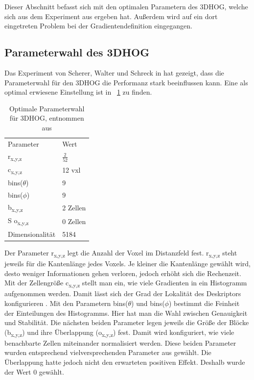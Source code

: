 Dieser Abschnitt befasst sich mit den optimalen Parametern des 3DHOG, welche sich aus dem Experiment aus \cite{scherer2010histograms} ergeben hat. Außerdem wird auf ein dort eingetreten Problem bei der Gradientendefinition eingegangen.
\subsection{Parameterwahl des 3DHOG}
Das Experiment von Scherer, Walter und Schreck in \cite{scherer2010histograms} hat gezeigt, dass die Parameterwahl für den 3DHOG die Performanz stark beeinflussen kann. Eine als optimal erwiesene Einstellung ist in \figurename~\ref{Parameter} zu finden.

\begin{table}[H]
	\centering
	\caption{Optimale Parameterwahl für 3DHOG, entnommen aus \cite{scherer2010histograms}}
	\label{Parameter}
	\begin{tabular}{ll}
		Parameter                & Wert     \\
		r\textsubscript{x,y,z} & $\frac{2}{52}$    \\
		c\textsubscript{x,y,z} & 12 vxl   \\
		bins($ \theta $)       & 9        \\
		bins($ \phi $)         & 9        \\
		b\textsubscript{x,y,z} & 2 Zellen \\S
		o\textsubscript{x,y,z} & 0 Zellen \\
		Dimensionalität          & 5184    
	\end{tabular}
	
\end{table}

Der Parameter r\textsubscript{x,y,z} legt die Anzahl der Voxel im Distanzfeld fest. r\textsubscript{x,y,z} steht jeweils für die Kantenlänge jedes Voxels. Je kleiner die Kantenlänge gewählt wird, desto weniger Informationen gehen verloren, jedoch erhöht sich die Rechenzeit. Mit der Zellengröße c\textsubscript{x,y,z} stellt man ein, wie viele Gradienten in ein Histogramm aufgenommen werden. Damit lässt sich der Grad der Lokalität des Deskriptors konfigurieren \cite{scherer2010histograms}.
Mit den Parametern 	bins($ \theta $) und bins($ \phi $) bestimmt die Feinheit der Einteilungen des Histogramms. Hier hat man die Wahl zwischen Genauigkeit und Stabilität.
Die nächsten beiden Parameter legen jeweils die Größe der Blöcke (b\textsubscript{x,y,z})  und ihre Überlappung  (o\textsubscript{x,y,z}) fest. Damit wird konfiguriert, wie viele benachbarte Zellen miteinander normalisiert werden. Diese beiden Parameter wurden entsprechend vielversprechenden Parameter aus \cite{dalal2005histograms} gewählt. Die Überlappung hatte jedoch nicht den erwarteten positiven Effekt. Deshalb wurde der Wert 0 gewählt.



